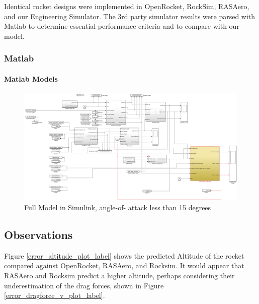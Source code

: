 \documentclass[]{article}
\let\oldparagraph\paragraph
\renewcommand{\paragraph}[1]{\oldparagraph{#1}\mbox{}}
\begin{document}
Identical rocket designs were implemented in OpenRocket, RockSim,
RASAero, and our Engineering Simulator. The 3rd party simulator results
were parsed with Matlab to determine essential performance criteria and
to compare with our model.

\clearpage

\subsubsection{Matlab}\label{matlab}

\paragraph{Matlab Models}\label{matlab-models}

\begin{figure}[htbp]
\centering
\includegraphics{images/rocket_model.png}
\caption{Full Model in Simulink, angle-of- attack less than 15 degrees
\label{full_model_test_label}}
\end{figure}

\clearpage

\subsection{Observations}\label{observations}

Figure \ref{error_altitude_plot_label} shows the predicted Altitude of
the rocket compared against OpenRocket, RASAero, and Rocksim. It would
appear that RASAero and Rocksim predict a higher altitude, perhaps
considering their underestimation of the drag forces, shown in Figure
\ref{error_dragforce_v_plot_label}.
\end{document}
